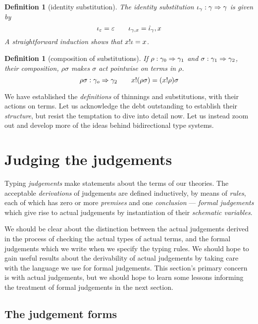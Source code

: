 \documentclass{jfp1}
\newtheorem{definition}[theorem]{Definition}
\newcommand{\emp}{\varepsilon}
\begin{document}
\newcommand{\isu}{\iota}
\begin{definition}[identity substitution]
  The identity substitution $\isu_\gamma : \gamma\su\gamma$ is given by
  \[\isu_\emp = \emp \qquad \isu_{\gamma,x} = \wka\isu_\gamma,x
  \]
  A straightforward induction shows that $\sel x\isu = x$.
\end{definition}

\begin{definition}[composition of substitutions]
  If $\rho : \gamma_0\Rightarrow\gamma_1$ and $\sigma : \gamma_1\Rightarrow\gamma_2$, their
  composition, $\rho\sigma$ makes $\sigma$ act \emph{pointwise} on terms in $\rho$.
  \[\rho\sigma : \gamma_o\Rightarrow\gamma_2\qquad x!(\rho\sigma) =
    (x!\rho)\sigma
  \]
\end{definition}


We have established the \emph{definitions} of thinnings and
substitutions, with their actions on terms. Let us acknowledge the
debt outstanding to establish their \emph{structure}, but resist the
temptation to dive into detail now. Let us instead zoom out and
develop more of the ideas behind bidirectional type systems.



\section{Judging the judgements}

Typing \emph{judgements} make statements about the terms of our
theories. The acceptable \emph{derivations} of judgements are defined
inductively, by means of \emph{rules}, each of which has zero or
more \emph{premises} and one \emph{conclusion} ---
\emph{formal judgements} which give rise to actual judgements by
instantiation of their \emph{schematic variables}.

We should be clear about the distinction between the actual judgements
derived in the process of checking the actual types of actual terms,
and the formal judgements which we write when we specify the typing
rules. We should hope to gain useful results about the derivability
of actual judgements by taking care with the language we use for
formal judgements. This section's primary concern is with actual
judgements, but we should hope to learn some lessons informing
the treatment of formal judgements in the next section.


\subsection{The judgement forms}
\end{document}
